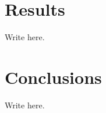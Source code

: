 \documentclass[10pt]{article}
\begin{document}
\section{Results}

Write here. 





\section{Conclusions}

Write here. 




\end{document}
